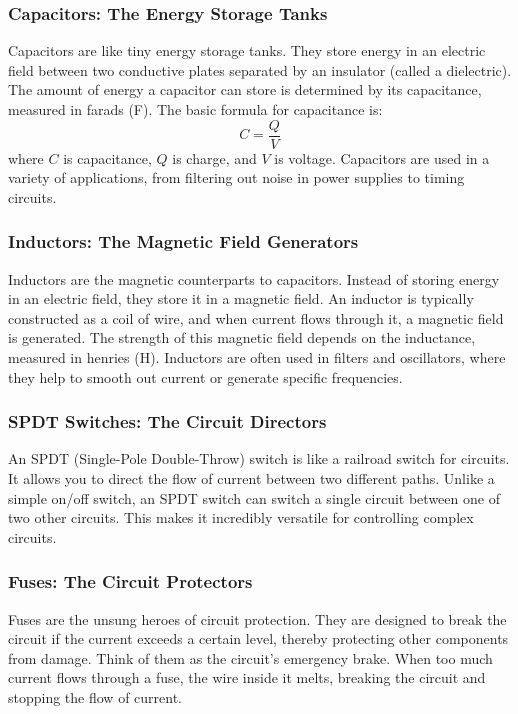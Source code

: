\subsubsection*{Capacitors: The Energy Storage Tanks}
Capacitors are like tiny energy storage tanks. They store energy in an electric field between two conductive plates separated by an insulator (called a dielectric). The amount of energy a capacitor can store is determined by its capacitance, measured in farads (F). The basic formula for capacitance is:
\begin{equation}
    C = \frac{Q}{V}
\end{equation}
where $C$ is capacitance, $Q$ is charge, and $V$ is voltage. Capacitors are used in a variety of applications, from filtering out noise in power supplies to timing circuits.

\subsubsection*{Inductors: The Magnetic Field Generators}
Inductors are the magnetic counterparts to capacitors. Instead of storing energy in an electric field, they store it in a magnetic field. An inductor is typically constructed as a coil of wire, and when current flows through it, a magnetic field is generated. The strength of this magnetic field depends on the inductance, measured in henries (H). Inductors are often used in filters and oscillators, where they help to smooth out current or generate specific frequencies.

\subsubsection*{SPDT Switches: The Circuit Directors}
An SPDT (Single-Pole Double-Throw) switch is like a railroad switch for circuits. It allows you to direct the flow of current between two different paths. Unlike a simple on/off switch, an SPDT switch can switch a single circuit between one of two other circuits. This makes it incredibly versatile for controlling complex circuits.

\subsubsection*{Fuses: The Circuit Protectors}
Fuses are the unsung heroes of circuit protection. They are designed to break the circuit if the current exceeds a certain level, thereby protecting other components from damage. Think of them as the circuit's emergency brake. When too much current flows through a fuse, the wire inside it melts, breaking the circuit and stopping the flow of current.

